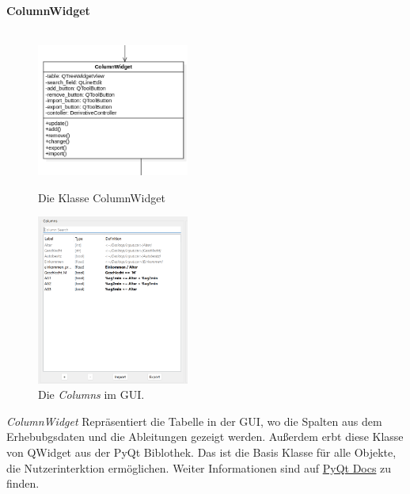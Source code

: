 \documentclass{article}
\begin{document}
\newpage
\textbf{\large{ColumnWidget}}\\\\
\begin{figure}[H]%
    \centering
    \begin{minipage}[b]{0.4\textwidth}
        \includegraphics[width=5cm]{entwurf/Entwurf_dokument/img/Alissa/ColumnWidget.png}
        \caption{Die Klasse ColumnWidget}
    \end{minipage}
    \hfill
    \begin{minipage}[b]{0.4\textwidth}
        \includegraphics[width=5cm]{entwurf/Entwurf_dokument/img/Alissa/Columns.png} 
    \caption{Die \textit{Columns} im GUI.}
    \end{minipage}
\end{figure}
\textit{ColumnWidget} Repräsentiert die Tabelle in der GUI, wo die Spalten aus dem Erhebubgsdaten und die Ableitungen gezeigt werden. Außerdem erbt diese Klasse von QWidget aus der PyQt Biblothek.  Das ist die Basis Klasse für alle Objekte, die Nutzerinterktion ermöglichen. Weiter Informationen sind auf \href{https://doc.qt.io/qt-6/qwidget.html}{PyQt Docs} zu finden.
\newline \newline
\end{document}

